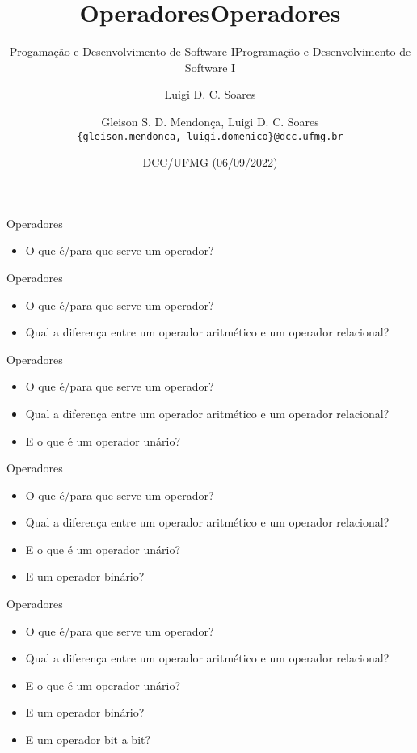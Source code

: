 \documentclass[t, aspectratio=169]{beamer}
\author{Luigi D. C. Soares}
\date{DCC/UFMG (06/09/2022)}
\title{Operadores}
\subtitle{Progamação e Desenvolvimento de Software I}
\title[Operadores]{Operadores}
\subtitle{Programação e Desenvolvimento de Software I}
\author[\tiny\{gleison.mendonca, luigi.domenico\}@dcc.ufmg.br]{%
Gleison S. D. Mendonça, Luigi D. C. Soares\texorpdfstring{\\}{}
\texttt{\{gleison.mendonca, luigi.domenico\}@dcc.ufmg.br}}
\institute[DCC/UFMG]{}
\date[06/09/2022]{}
\begin{document}
\maketitle

\begin{frame}[label={sec:orgb35d814}]{Operadores}
\begin{itemize}
\item O que é/para que serve um operador?
\end{itemize}
\end{frame}

\begin{frame}[label={sec:org6c42abf}]{Operadores}
\begin{itemize}
\item O que é/para que serve um operador?
\item Qual a diferença entre um operador \alert{aritmético} e um operador \alert{relacional}?
\end{itemize}
\end{frame}

\begin{frame}[label={sec:org5593e40}]{Operadores}
\begin{itemize}
\item O que é/para que serve um operador?
\item Qual a diferença entre um operador \alert{aritmético} e um operador \alert{relacional}?
\item E o que é um operador \alert{unário}?
\end{itemize}
\end{frame}

\begin{frame}[label={sec:org76719ca}]{Operadores}
\begin{itemize}
\item O que é/para que serve um operador?
\item Qual a diferença entre um operador \alert{aritmético} e um operador \alert{relacional}?
\item E o que é um operador \alert{unário}?
\item E um operador \alert{binário}?
\end{itemize}
\end{frame}

\begin{frame}[label={sec:org1af1204}]{Operadores}
\begin{itemize}
\item O que é/para que serve um operador?
\item Qual a diferença entre um operador \alert{aritmético} e um operador \alert{relacional}?
\item E o que é um operador \alert{unário}?
\item E um operador \alert{binário}?
\item E um operador \alert{bit a bit}?
\end{itemize}
\end{frame}
\end{document}
